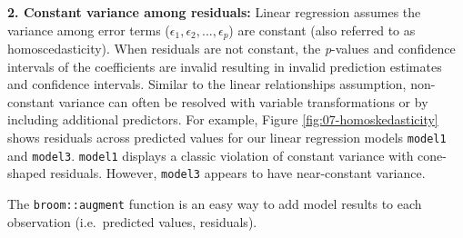 \documentclass[]{book}
\newenvironment{Shaded}{\begin{snugshade}}{\end{snugshade}}
\newcommand{\DataTypeTok}[1]{\textcolor[rgb]{0.13,0.29,0.53}{#1}}
\newcommand{\DecValTok}[1]{\textcolor[rgb]{0.00,0.00,0.81}{#1}}
\newcommand{\FloatTok}[1]{\textcolor[rgb]{0.00,0.00,0.81}{#1}}
\newcommand{\KeywordTok}[1]{\textcolor[rgb]{0.13,0.29,0.53}{\textbf{#1}}}
\newcommand{\NormalTok}[1]{#1}
\newcommand{\OperatorTok}[1]{\textcolor[rgb]{0.81,0.36,0.00}{\textbf{#1}}}
\newcommand{\StringTok}[1]{\textcolor[rgb]{0.31,0.60,0.02}{#1}}
\theoremstyle{definition}
\theoremstyle{definition}
\theoremstyle{definition}
\theoremstyle{remark}
\begin{document}
\textbf{2. Constant variance among residuals:} Linear regression assumes
the variance among error terms
(\(\epsilon_1, \epsilon_2, ..., \epsilon_p\)) are constant (also
referred to as homoscedasticity). When residuals are not constant, the
\emph{p}-values and confidence intervals of the coefficients are invalid
resulting in invalid prediction estimates and confidence intervals.
Similar to the linear relationships assumption, non-constant variance
can often be resolved with variable transformations or by including
additional predictors. For example, Figure \ref{fig:07-homoskedasticity}
shows residuals across predicted values for our linear regression models
\texttt{model1} and \texttt{model3}. \texttt{model1} displays a classic
violation of constant variance with cone-shaped residuals. However,
\texttt{model3} appears to have near-constant variance.

\begin{tip}
The \texttt{broom::augment} function is an easy way to add model results
to each observation (i.e.~predicted values, residuals).
\end{tip}

\begin{Shaded}
\end{Shaded}
\end{document}
